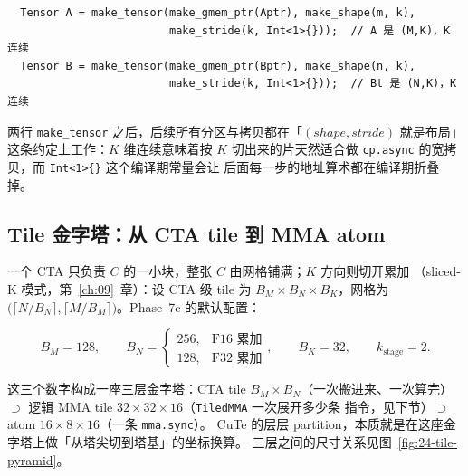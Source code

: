 \begin{lstlisting}
  Tensor A = make_tensor(make_gmem_ptr(Aptr), make_shape(m, k),
                         make_stride(k, Int<1>{}));  // A 是 (M,K)，K 连续
  Tensor B = make_tensor(make_gmem_ptr(Bptr), make_shape(n, k),
                         make_stride(k, Int<1>{}));  // Bt 是 (N,K)，K 连续
\end{lstlisting}

两行 \texttt{make\_tensor} 之后，后续所有分区与拷贝都在「$(shape,stride)$
就是布局」这条约定上工作：$K$ 维连续意味着按 $K$ 切出来的片天然适合做
\texttt{cp.async} 的宽拷贝，而 \texttt{Int<1>\{\}} 这个编译期常量会让
后面每一步的地址算术都在编译期折叠掉。

\subsection{Tile 金字塔：从 CTA tile 到 MMA atom}

一个 CTA 只负责 $C$ 的一小块，整张 $C$ 由网格铺满；$K$ 方向则切开累加
（sliced-K 模式，第~\ref{ch:09}~章）：设 CTA 级 tile 为
$B_M\times B_N\times B_K$，网格为
$\bigl(\lceil N/B_N\rceil,\lceil M/B_M\rceil\bigr)$。Phase~7c 的默认配置：

\begin{equation}
  B_M=128,\qquad
  B_N=\begin{cases}256, & \text{F16 累加}\\ 128, & \text{F32 累加}\end{cases},
  \qquad B_K=32,\qquad k_{\mathrm{stage}}=2 .
  \label{eq:24-tile}
\end{equation}

这三个数字构成一座三层金字塔：CTA tile $B_M\times B_N$（一次搬进来、一次算完）
$\supset$ 逻辑 MMA tile $32\times32\times16$（\texttt{TiledMMA} 一次展开多少条
指令，见下节）$\supset$ atom $16\times8\times16$（一条 \texttt{mma.sync}）。
CuTe 的层层 partition，本质就是在这座金字塔上做「从塔尖切到塔基」的坐标换算。
三层之间的尺寸关系见图~\ref{fig:24-tile-pyramid}。

